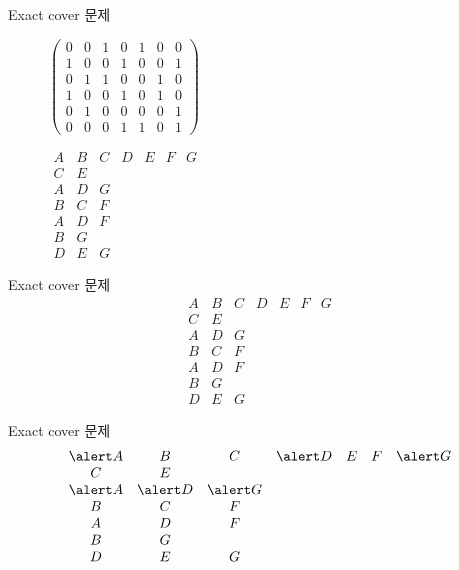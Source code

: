 \documentclass{beamer}
\begin{document}
\begin{frame}{Exact cover 문제}
  \centering
  \begin{figure}[!htb]
    \begin{minipage}{.6\textwidth}
      \centering
      $\left(\begin{array}{ccccccc}
    0&0&1&0&1&0&0\\
    1&0&0&1&0&0&1\\
    0&1&1&0&0&1&0\\
    1&0&0&1&0&1&0\\
    0&1&0&0&0&0&1\\
    0&0&0&1&1&0&1
  \end{array}\right)$
    \end{minipage}%
    \begin{minipage}{.4\textwidth}
      \centering
  $
  \begin{array}{ccccccc}
    A & B & C & D & E & F & G\\
    C & E &&&&&\\
    A & D & G &&&&\\
    B & C & F &&&&\\
    A & D & F &&&&\\
    B & G &&&&&\\
    D & E & G &&&&
  \end{array}
  $
    \end{minipage}
\end{figure}
\end{frame}

%
\begin{frame}{Exact cover 문제} 
  $$
  \begin{array}{ccccccc}
    A & B & C & D & E & F & G\\
    C & E &&&&&\\
    A & D & G &&&&\\
    B & C & F &&&&\\
    A & D & F &&&&\\
    B & G &&&&&\\
    D & E & G &&&&
  \end{array}
  $$
\end{frame}

%
\begin{frame}{Exact cover 문제} 
  $$
  \begin{array}{ccccccc}
    \alert A & B & C & \alert D & E & F & \alert G\\
    C & E &&&&&\\
    \alert A & \alert D & \alert G &&&&\\
    B & C & F &&&&\\
    A & D & F &&&&\\
    B & G &&&&&\\
    D & E & G &&&&
  \end{array}
  $$
\end{frame}
\end{document}
